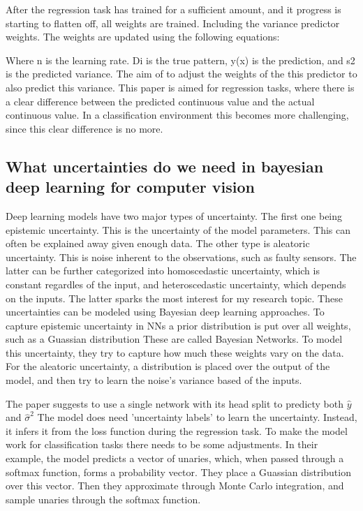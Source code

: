 \documentclass[10pt]{article}
\begin{document}
After the regression task has trained for a sufficient amount, and it progress is starting to flatten off, all weights are trained. Including the variance predictor weights. The weights are updated using the following equations:

Where n is the learning rate. Di is the true pattern, y(x) is the prediction, and s2 is the predicted variance. The aim of to adjust the weights of the this predictor to also predict this variance.
This paper is aimed for regression tasks, where there is a clear difference between the predicted continuous value and the actual continuous value. In a classification environment this becomes more challenging, since this clear difference is no more.

\subsection*{What uncertainties do we need in bayesian deep learning for computer vision \cite{kendall2017uncertainties}}

Deep learning models have two major types of uncertainty. The first one being epistemic uncertainty.
This is the uncertainty of the model parameters. This can often be explained away given enough data.
The other type is aleatoric uncertainty. This is noise inherent to the observations, such as faulty sensors.
The latter can be further categorized into homoscedastic uncertainty, which is constant regardles of the input,
and heteroscedastic uncertainty, which depends on the inputs. The latter sparks the most interest for my research topic.
These uncertainties can be modeled using Bayesian deep learning approaches.
To capture epistemic uncertainty in NNs a prior distribution is put over all weights, such as a Guassian distribution
These are called Bayesian Networks. To model this uncertainty, they try to capture how much these weights vary on the data.
For the aleatoric uncertainty, a distribution is placed over the output of the model, and then try to learn the noise's variance based of the inputs.


The paper suggests to use a single network with its head split to predicty both $\hat{y}$ and $\hat{\sigma}^2$
The model does need 'uncertainty labels' to learn the uncertainty. Instead, it infers it from the loss function during the regression task.
To make the model work for classification tasks there needs to be some adjustments. In their example, the model predicts a vector of unaries,
which, when passed through a softmax function, forms a probability vector. They place a Guassian distribution over this vector.
Then they approximate through Monte Carlo integration, and sample unaries through the softmax function.
\end{document}
